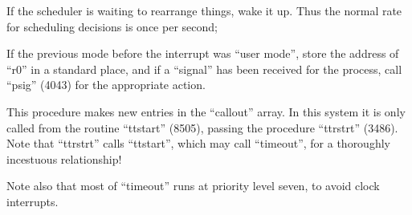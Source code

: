 \bd
\item[3820:] If the scheduler is waiting to
 rearrange things, wake it up.
 Thus the normal rate for scheduling decisions is once per second;

\item[3824:] If the previous mode before the
 interrupt was ``user mode'', store
 the address of ``r0'' in a standard
 place, and if a ``signal'' has been
 received for the process, call
 ``psig'' (4043) for the appropriate
 action.
\ed



This procedure makes new entries in the
``callout'' array. In this system it is
only called from the routine ``ttstart''
(8505), passing the procedure ``ttrstrt''
(3486). Note that ``ttrstrt'' calls
``ttstart'', which may call ``timeout'',
for a thoroughly incestuous relationship!

Note also that most of ``timeout'' runs
at priority level seven, to avoid clock
interrupts.

